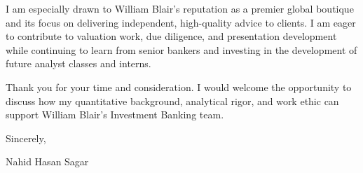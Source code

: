 \documentclass[10pt,letterpaper]{article}
\begin{document}
I am especially drawn to William Blair's reputation as a premier global boutique and its focus on delivering independent, high-quality advice to clients. I am eager to contribute to valuation work, due diligence, and presentation development while continuing to learn from senior bankers and investing in the development of future analyst classes and interns.

Thank you for your time and consideration. I would welcome the opportunity to discuss how my quantitative background, analytical rigor, and work ethic can support William Blair's Investment Banking team.

\vspace{1em}

Sincerely,\\
\vspace{1em}

Nahid Hasan Sagar
\end{document}
